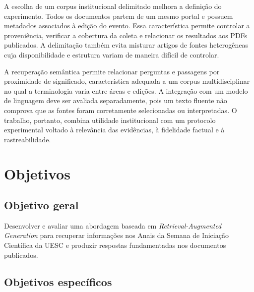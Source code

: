 A escolha de um corpus institucional delimitado melhora a definição do experimento. Todos os documentos partem de um mesmo portal e possuem metadados associados à edição do evento. Essa característica permite controlar a proveniência, verificar a cobertura da coleta e relacionar os resultados aos PDFs publicados. A delimitação também evita misturar artigos de fontes heterogêneas cuja disponibilidade e estrutura variam de maneira difícil de controlar.

A recuperação semântica permite relacionar perguntas e passagens por proximidade de significado, característica adequada a um corpus multidisciplinar no qual a terminologia varia entre áreas e edições. A integração com um modelo de linguagem deve ser avaliada separadamente, pois um texto fluente não comprova que as fontes foram corretamente selecionadas ou interpretadas. O trabalho, portanto, combina utilidade institucional com um protocolo experimental voltado à relevância das evidências, à fidelidade factual e à rastreabilidade.

\section{Objetivos}

\subsection{Objetivo geral}

Desenvolver e avaliar uma abordagem baseada em \textit{Retrieval-Augmented Generation} para recuperar informações nos Anais da Semana de Iniciação Científica da UESC e produzir respostas fundamentadas nos documentos publicados.

\subsection{Objetivos específicos}

